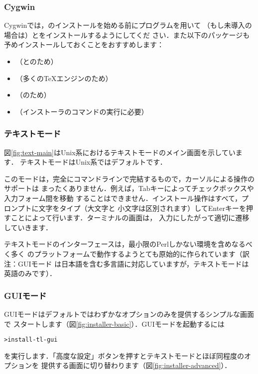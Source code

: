 \documentclass[uplatex,dvipdfmx,tombow]{jsarticle}
\begin{document}
\subsubsection{Cygwin}
\label{sec:cygwin}

Cygwinでは，\TL のインストールを始める前にプログラムを用いて
（もし未導入の場合は）とをインストールするようにしてくだ
さい．また以下のパッケージも予めインストールしておくことをおすすめします：
%
\begin{itemize}
\item {}（\XeTeX と\LuaTeX のため）
\item {}（多くの\TeX エンジンのため）
\item {}（のため）
\item {}（インストーラのコマンドの実行に必要）
\end{itemize}

\subsubsection{テキストモード}

図\ref{fig:text-main}はUnix系におけるテキストモードのメイン画面を示しています．
テキストモードはUnix系ではデフォルトです．

このモードは，完全にコマンドラインで完結するもので，カーソルによる操作のサポートは
まったくありません．例えば，Tabキーによってチェックボックスや入力フォーム間を移動
することはできません．インストール操作はすべて，プロンプトに文字をタイプ（大文字と
小文字は区別されます）してEnterキーを押すことによって行います．ターミナルの画面は，
入力にしたがって適切に遷移していきます．

テキストモードのインターフェースは，最小限のPerlしかない環境を含めなるべく多く
のプラットフォームで動作するようとても原始的に作られています（訳注：GUIモード
は日本語を含む多言語に対応していますが，テキストモードは英語のみです）．

\subsubsection{GUIモード}
\label{sec:graphical-inst}

GUIモードはデフォルトではわずかなオプションのみを提供するシンプルな画面で
スタートします（図\ref{fig:installer-basic}）．GUIモードを起動するには
%
\begin{alltt}
> install-tl -gui
\end{alltt}
%
を実行します．「高度な設定」ボタンを押すとテキストモードとほぼ同程度のオプションを
提供する画面に切り替わります（図\ref{fig:installer-advanced}）．
\end{document}
